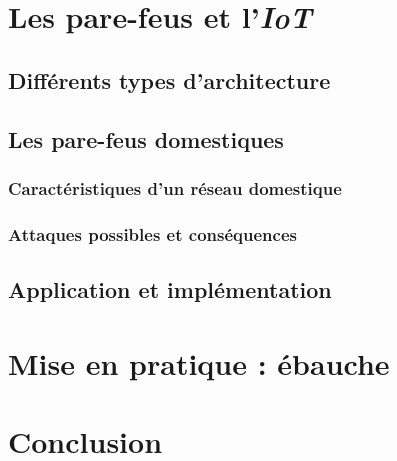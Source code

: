 \documentclass[]{article}
\begin{document}
\newpage
\section{Les pare-feus et l'\textit{IoT}}

\subsection{Différents types d'architecture}

\subsection{Les pare-feus domestiques}

\subsubsection{Caractéristiques d'un réseau domestique}

\subsubsection{Attaques possibles et conséquences}

\subsection{Application et implémentation}

\newpage

\section{Mise en pratique : ébauche}
\newpage
\section*{Conclusion}
\end{document}
